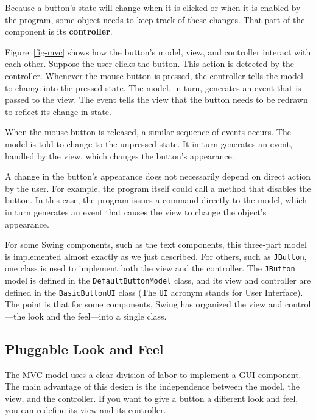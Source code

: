 Because a button's state will change when it is clicked or when it is
enabled by the program, some object needs to keep track of these
changes.  That part of the component is its {\bf
controller}.  

Figure~\ref{fig-mvc} shows how the button's model, view, and
controller interact with each other.  Suppose the user clicks the
button.  This action is detected by the controller.  Whenever the mouse
button is pressed, the controller tells the model to change into the
pressed state.  The model, in turn, generates an event that is passed
to the view.  The event tells the view that the button needs to be
redrawn to reflect its change in state.

\begin{figure}[t]
\end{figure}

When the mouse button is released, a similar sequence of events occurs.
The model is told to change to the unpressed state.  It in turn
generates an event, handled by the view, which changes the button's
appearance.

A change in the button's appearance does not necessarily depend on
direct action by the user.  For example, the program itself could call a
method that disables the button.  In this case, the program issues a
\mbox{command} \mbox{directly} to the model, which in turn generates an event that
causes the view to change the object's appearance.

For some Swing components, such as the text components, this
three-part model is implemented almost exactly as we just
described.  For others, such as {\tt JButton}, one class is used to
implement both the view and the controller.  The {\tt JButton} model is
defined in the {\tt DefaultButtonModel} class, and its view and
controller are defined in the {\tt BasicButtonUI} class (The {\tt UI}
acronym stands for User Interface).  The point is that for some
components, Swing has organized the view and control---the look and
the feel---into a single class.

\subsection{Pluggable Look and Feel}
\noindent The MVC model uses a clear division of labor to implement a GUI
component.   The main advantage of this design is the independence
between the model, the view, and the controller.  If you want to give a
button a different look and feel, you can redefine its view and its
controller.

